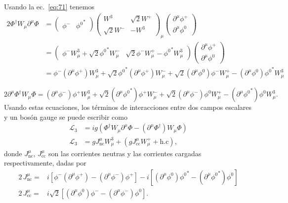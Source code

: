 Usando la ec.~\eqref{eq:71} tenemos
\begin{align}
  2\Phi^\dagger W_\mu\partial^\mu\Phi&=
  \begin{pmatrix}
    \phi^-&{\phi^0}^*
  \end{pmatrix}
\begin{pmatrix}
    W^3&\sqrt{2}W^+\\
    \sqrt{2}W^-&-W^3
  \end{pmatrix}_\mu
  \begin{pmatrix}
    \partial^\mu\phi^+\\
    \partial^\mu{\phi^0}
  \end{pmatrix}\nonumber\\
  &=\begin{pmatrix}
    \phi^- W^3_\mu+\sqrt{2}{\phi^0}^* W^-_\mu & \sqrt{2}\phi^- W^+_\mu-{\phi^0}^* W^3_\mu 
  \end{pmatrix}
  \begin{pmatrix}
    \partial^\mu\phi^+\\
    \partial^\mu{\phi^0}
  \end{pmatrix}\nonumber\\ 
  &= \phi^- \left(\partial^\mu\phi^+\right) W^3_\mu+\sqrt{2}{\phi^0}^*\left(\partial^\mu\phi^+\right) W^-_\mu 
  +\sqrt{2}\left(\partial^\mu\phi^0\right) \phi^- W^+_\mu-\left(\partial^\mu\phi^0\right){\phi^0}^* W^3_\mu
\end{align}

\begin{equation}
  2\partial^\mu\Phi^\dagger W_\mu\Phi =
\left(\partial^\mu\phi^-\right) \phi^+ W^3_\mu+\sqrt{2}\left(\partial^\mu{\phi^0}^*\right)\phi^+ W^-_\mu 
  +\sqrt{2}\left(\partial^\mu\phi^-\right) \phi^0 W^+_\mu-\left(\partial^\mu{\phi^0}^*\right)\phi^0 W^3_\mu.
\end{equation}
Usando estas ecuaciones, los t\'erminos de interacciones entre dos campos escalares y un bos\'on gauge se puede escribir como
\begin{align}
  \mathcal{L}_3&=ig\left(\Phi^\dagger W_\mu\partial^\mu\Phi-\left(\partial^\mu\Phi^\dagger\right)W_\mu\Phi\right)\nonumber\\
  \label{eq:74}
  \mathcal{L}_3&=gJ_{\text{nc}}^\mu W^3_\mu+\left(gJ_{\text{cc}}^\mu W^+_\mu+\text{h.c}\right),
\end{align}
donde $J_{\text{nc}}^\mu$, $J_{\text{cc}}^\mu$ son las corrientes neutras y las corrientes cargadas respectivamente, dadas por
\begin{align}
  2\,J_{\text{nc}}^\mu=& i\left[\phi^- \left(\partial^\mu\phi^+\right)-\left(\partial^\mu\phi^-\right) \phi^+\right]-i\left[\left(\partial^\mu\phi^0\right){\phi^0}^*-\left(\partial^\mu{\phi^0}^*\right)\phi^0\right]\nonumber\\
  2\,J_{\text{cc}}^\mu=&i\sqrt{2}\left[\left(\partial^\mu\phi^0\right) \phi^--\left(\partial^\mu\phi^-\right) \phi^0\right].
\end{align}


